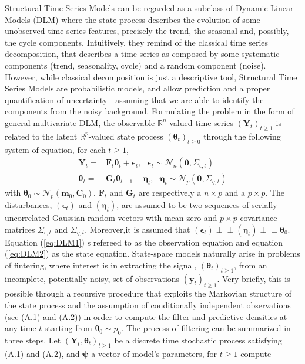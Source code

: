 \documentclass[
  12pt,
]{book}
\theoremstyle{break}
\theoremstyle{nonumberplain}
\begin{document}
Structural Time Series Models can be regarded as a subclass of Dynamic
Linear Models (DLM) where the state process describes the evolution of
some unobserved time series features, precisely the trend, the seasonal
and, possibly, the cycle components. Intuitively, they remind of the
classical time series decomposition, that describes a time series as
composed by some systematic components (trend, seasonality, cycle) and a
random component (noise). However, while classical decomposition is just
a descriptive tool, Structural Time Series Models are probabilistic
models, and allow prediction and a proper quantification of uncertainty
- assuming that we are able to identify the components from the noisy
background. Formulating the problem in the form of general multivariate
DLM, the observable \(\mathbb{R}^{n}\)-valued time series
\((\boldsymbol{Y}_{t})_{t\geq 1}\) is related to the latent
\(\mathbb{R}^{p}\)-valued state process
\((\boldsymbol{\theta}_{t})_{t\geq 0}\) through the following system of
equation, for each \(t\geq1\), \begin{align} \label{eq:DLM1}
\boldsymbol{Y}_{t} = & \boldsymbol{F}_{t}\boldsymbol{\theta}_{t}+\boldsymbol{\epsilon}_{t}, \ \ \ \boldsymbol{\epsilon}_{t}\sim\mathcal{N}_{n}(\boldsymbol{0},\Sigma_{\epsilon,t}) \\
\boldsymbol{\theta}_{t} = & \boldsymbol{G}_{t}\boldsymbol{\theta}_{t-1}+\boldsymbol{\eta}_{t}, \ \ \ \boldsymbol{\eta}_{t}\sim\mathcal{N}_{p}(\boldsymbol{0},\Sigma_{\eta,t}) \label{eq:DLM2}
\end{align} with
\(\boldsymbol{\theta}_{0}\sim\mathcal{N}_{p}(\boldsymbol{m}_{0},\boldsymbol{C}_{0})\).
\(\boldsymbol{F}_{t}\) and \(\boldsymbol{G}_{t}\) are respectively a
\(n \times p\) and a \(p \times p\). The disturbances,
\((\boldsymbol{\epsilon}_{t})\) and \((\boldsymbol{\eta}_{t})\), are
assumed to be two sequences of serially uncorrelated Gaussian random
vectors with mean zero and \(p \times p\) covariance matrices
\(\Sigma_{\epsilon,t}\) and \(\Sigma_{\eta,t}\). Moreover,it is assumed
that
\((\boldsymbol{\epsilon}_{t}) \perp\!\!\!\perp (\boldsymbol{\eta}_{t})\perp\!\!\!\perp \boldsymbol{\theta}_{0}\).
Equation (\ref{eq:DLM1}) s refereed to as the observation equation and
equation (\ref{eq:DLM2}) as the state equation. State-space models
naturally arise in problems of fintering, where interest is in
extracting the signal, \((\boldsymbol{\theta}_{t})_{t \geq 1}\), from an
incomplete, potentially noisy, set of observations
\((\boldsymbol{y}_{t})_{t\geq 1}\). Very briefly, this is possible
through a recursive procedure that exploits the Markovian structure of
the state process and the assumption of conditionally independent
observations (see (A.1) and (A.2)) in order to compute the filter and
predictive densities at any time \(t\) starting from
\(\boldsymbol{\theta}_{0}\sim p_{0}\). The process of filtering can be
summarized in three steps. Let
\((\boldsymbol{Y}_{t},\boldsymbol{\theta}_{t})_{t \geq 1}\) be a
discrete time stochastic process satisfying (A.1) and (A.2), and
\(\boldsymbol{\psi}\) a vector of model's parameters, for \(t\geq 1\)
compute
\end{document}
